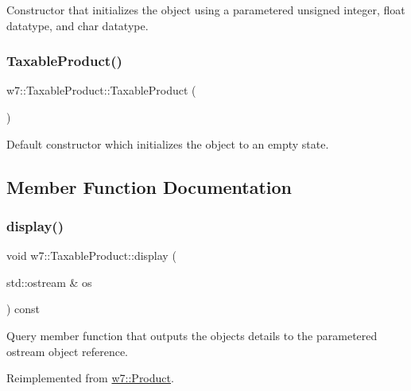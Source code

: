 Constructor that initializes the object using a parametered unsigned integer, float datatype, and char datatype. \mbox{\label{classw7_1_1TaxableProduct_ab9ee3a59e2483d33652ef4103f807e9a}} 
\subsubsection{\texorpdfstring{Taxable\+Product()}{TaxableProduct()}\hspace{0.1cm}{\footnotesize\ttfamily [2/2]}}
{\footnotesize\ttfamily w7\+::\+Taxable\+Product\+::\+Taxable\+Product (\begin{DoxyParamCaption}{ }\end{DoxyParamCaption})}

Default constructor which initializes the object to an empty state. 

\subsection{Member Function Documentation}
\mbox{\label{classw7_1_1TaxableProduct_a57f8cd41d82054c77a7f7f1cf204cc7d}} 
\subsubsection{\texorpdfstring{display()}{display()}}
{\footnotesize\ttfamily void w7\+::\+Taxable\+Product\+::display (\begin{DoxyParamCaption}\item[{std\+::ostream \&}]{os }\end{DoxyParamCaption}) const\hspace{0.3cm}{\ttfamily [virtual]}}

Query member function that outputs the object\textquotesingle{}s details to the parametered ostream object reference. 

Reimplemented from \mbox{\hyperlink{classw7_1_1Product_a60b146f19a712d3eadd1b93a48c54e7d}{w7\+::\+Product}}.

\mbox{\label{classw7_1_1TaxableProduct_a3f41864e2a88fa6d847b7fcb704f41f9}} 
